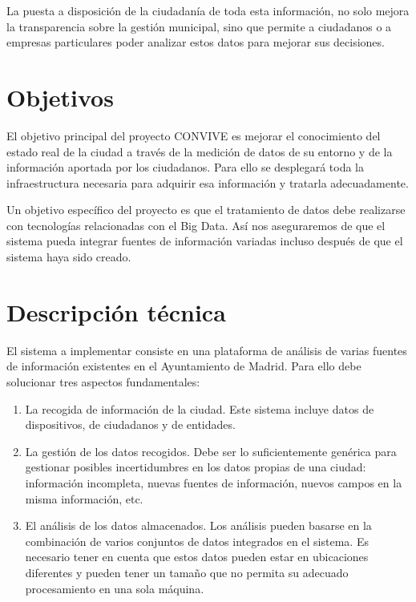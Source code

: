 \documentclass[
  a4paper,
]{scrreport}
\providecommand{\tightlist}{%
  \setlength{\itemsep}{0pt}\setlength{\parskip}{0pt}}\usepackage{longtable,booktabs,array}
\begin{document}
La puesta a disposición de la ciudadanía de toda esta información, no
solo mejora la transparencia sobre la gestión municipal, sino que
permite a ciudadanos o a empresas particulares poder analizar estos
datos para mejorar sus decisiones.

\hypertarget{objetivos-2}{%
\section{Objetivos}\label{objetivos-2}}

El objetivo principal del proyecto CONVIVE es mejorar el conocimiento
del estado real de la ciudad a través de la medición de datos de su
entorno y de la información aportada por los ciudadanos. Para ello se
desplegará toda la infraestructura necesaria para adquirir esa
información y tratarla adecuadamente.

Un objetivo específico del proyecto es que el tratamiento de datos debe
realizarse con tecnologías relacionadas con el Big Data. Así nos
aseguraremos de que el sistema pueda integrar fuentes de información
variadas incluso después de que el sistema haya sido creado.

\hypertarget{descripciuxf3n-tuxe9cnica}{%
\section{Descripción técnica}\label{descripciuxf3n-tuxe9cnica}}

El sistema a implementar consiste en una plataforma de análisis de
varias fuentes de información existentes en el Ayuntamiento de Madrid.
Para ello debe solucionar tres aspectos fundamentales:

\begin{enumerate}
\def\labelenumi{\arabic{enumi}.}
\tightlist
\item
  La recogida de información de la ciudad. Este sistema incluye datos de
  dispositivos, de ciudadanos y de entidades.
\item
  La gestión de los datos recogidos. Debe ser lo suficientemente
  genérica para gestionar posibles incertidumbres en los datos propias
  de una ciudad: información incompleta, nuevas fuentes de información,
  nuevos campos en la misma información, etc.
\item
  El análisis de los datos almacenados. Los análisis pueden basarse en
  la combinación de varios conjuntos de datos integrados en el sistema.
  Es necesario tener en cuenta que estos datos pueden estar en
  ubicaciones diferentes y pueden tener un tamaño que no permita su
  adecuado procesamiento en una sola máquina.
\end{enumerate}
\end{document}
